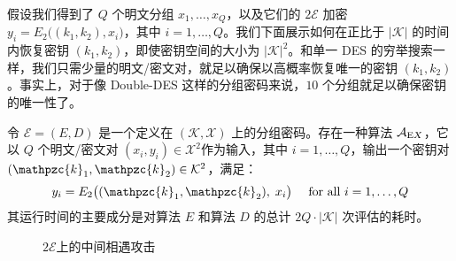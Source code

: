 假设我们得到了 $Q$ 个明文分组 $x_1,\dots,x_Q$，以及它们的 $2\mathcal{E}$ 加密 $y_i=E_2\big((k_1,k_2),x_i\big)$，其中 $i=1,\dots,Q$。我们下面展示如何在正比于 $|\mathcal{K}|$ 的时间内恢复密钥 $(k_1,k_2)$，即使密钥空间的大小为 $|\mathcal{K}|^2$。和单一 DES 的穷举搜索一样，我们只需少量的明文/密文对，就足以确保以高概率恢复唯一的密钥 $(k_1,k_2)$。事实上，对于像 Double-DES 这样的分组密码来说，$10$ 个分组就足以确保密钥的唯一性了。

\begin{theorem}\label{theo:4-2}
令 $\mathcal{E}=(E,D)$ 是一个定义在 $(\mathcal{K},\mathcal{X})$ 上的分组密码。存在一种算法 $\mathcal{A}_{{\rm E}X}$，它以 $Q$ 个明文/密文对 $(x_i,y_i)\in\mathcal{X}^2$作为输入，其中 $i=1,\dots,Q$，输出一个密钥对 $(\mathpzc{k}_1,\mathpzc{k}_2)\in\mathcal{K}^2$，满足：
\begin{equation}\label{eq:4-9}
y_i=E_2\big((\mathpzc{k}_1,\mathpzc{k}_2),\;x_i\big)
\quad\text{ for all }
i=1,\dots,Q
\end{equation}
其运行时间的主要成分是对算法 $E$ 和算法 $D$ 的总计 $2Q\cdot|\mathcal{K}|$ 次评估的耗时。
\end{theorem}

\begin{figure}
  \centering
  
  \caption{$2\mathcal{E}$上的中间相遇攻击}
  \label{fig:4-10}
\end{figure}

